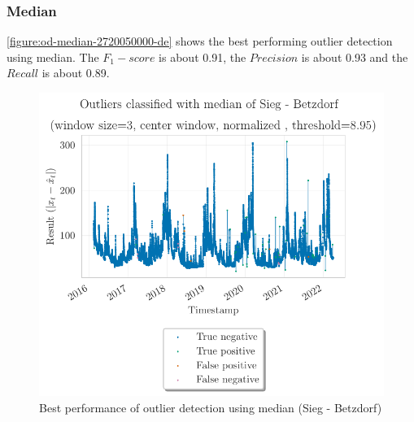 \subsubsection{Median}
\autoref{figure:od-median-2720050000-de} shows the best performing outlier detection using median. The $F_1-score$ is about 0.91, the $Precision$ is about 0.93 and the $Recall$ is about 0.89.
\begin{figure}[htp]
    \centering 
    \includegraphics{plots/pdfs/2720050000-de/od_median_2720050000-de_all.pdf}
    \caption{Best performance of outlier detection using median (Sieg - Betzdorf)}
    \label{figure:od-median-2720050000-de}
\end{figure}

